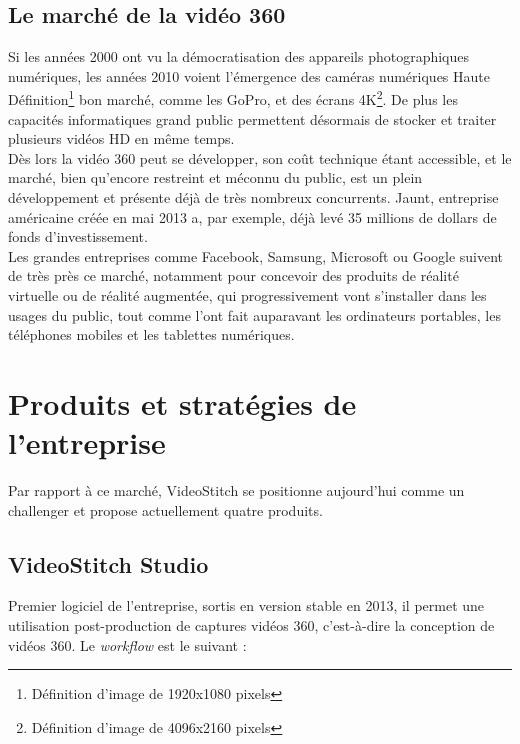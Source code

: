 \subsection{Le marché de la vidéo 360}
Si les années 2000 ont vu la démocratisation des appareils photographiques numériques,
les années 2010 voient l'émergence des caméras numériques Haute 
Définition\footnote{Définition d'image de 1920x1080 pixels} bon marché, comme les GoPro,
et des écrans 4K\footnote{Définition d'image de 4096x2160 pixels}. De plus les capacités
informatiques grand public permettent désormais de stocker et traiter plusieurs 
vidéos HD en même temps.\\
Dès lors la vidéo 360 peut se développer, son coût technique
étant accessible, et le marché, bien qu'encore restreint et méconnu du public,
est un plein développement et présente déjà de très nombreux concurrents. Jaunt,
entreprise américaine créée en mai 2013 a, par exemple, déjà levé 35 millions
de dollars de fonds d'investissement\cite{jaunt-fundings}.\\
Les grandes entreprises comme Facebook\cite{facebook-vr}, Samsung\cite{samsung-vr}, 
Microsoft\cite{microsoft-vr} ou Google\cite{google-vr} suivent de
très près ce marché, notamment pour concevoir des produits de réalité virtuelle 
ou de réalité augmentée, qui progressivement vont s'installer dans les usages
du public, tout comme l'ont fait auparavant les ordinateurs portables, les téléphones mobiles
et les tablettes numériques.\\

\section{Produits et stratégies de l'entreprise}
Par rapport à ce marché, VideoStitch se positionne aujourd'hui comme un challenger
et propose actuellement quatre produits\cite{videostitch-products}.
\subsection{VideoStitch Studio}
\label{videostitch-studio-section}
\label{videostitch-studio}
Premier logiciel de l'entreprise, sortis en version stable en 2013,
il permet une utilisation post-production de captures vidéos 360, c'est-à-dire 
la conception de vidéos 360. Le \textit{workflow} est le suivant : 
